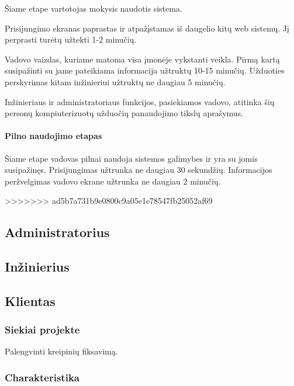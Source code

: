 			Šiame etape vartotojas mokysis naudotis sistema.
			
			Prisijungimo ekranas paprastas ir atpažįstamas iš daugelio kitų web sistemų.
			Jį perprasti turėtų užtekti 1-2 minučių.

			Vadovo vaizdas, kuriame matoma visa įmonėje vykstanti veikla.
			Pirmą kartą susipažinti su jame pateikiama informacija užtruktų 10-15 minučių.
			Užduoties perskyrimas kitam inžinieriui užtruktų ne daugiau 5 minučių.
						
			Inžinieriaus ir administratoriaus funkcijos, pasiekiamos vadovo, atitinka šių personų kompiuterizuotų užduočių panaudojimo tikslų aprašymus.
			
			\setcounter{tocdepth}{5} \setcounter{secnumdepth}{5}
			
			\paragraph{Pilno naudojimo etapas}
			
			Šiame etape vadovas pilnai naudoja sistemos galimybes ir yra su jomis susipažinęs.
			Prisijungimas užtrunka ne daugiau 30 sekundžių. Informacijos peržvelgimas vadovo ekrane užtrunka ne daugiau 2 minučių.
			
			
	
>>>>>>> ad5b7a731b9e0800c9a05e1e78547fb25052af69
	\subsection{Administratorius}
	
	\subsection{Inžinierius}
	
	\subsection{Klientas}
			
		\subsubsection{Siekiai projekte}
		
		Palengvinti kreipinių fiksavimą.
		
		\subsubsection{Charakteristika}
		
